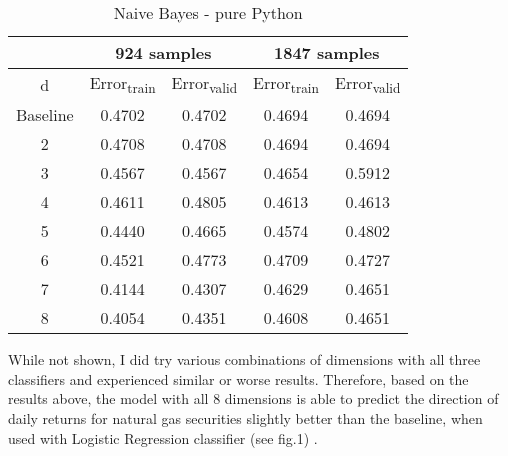 \documentclass[conference,letterpaper]{IEEEtran}
\begin{document}
\begin{table}[h]
\renewcommand{\arraystretch}{1.2}
\renewcommand{\thefootnote}{\alph{footnote}}
\caption{Naive Bayes - pure Python} \label{table3}
\begin{minipage} {0.5\textwidth}
\begin{center}
    \begin{tabular}{ | c | c | c | c | c |}
    \hline
\multirow{2}{0.1in}{} 
& \multicolumn{2}{|c|}{924 samples} & \multicolumn{2}{|c|}{1847 samples} \\
\cline{2-4}
    \hline
    d & Error\textsubscript{train} & Error\textsubscript{valid} & Error\textsubscript{train} & Error\textsubscript{valid} \\ \hline
    Baseline & 0.4702 & 0.4702 & 0.4694 & 0.4694 \\ \hline
    2 & 0.4708 & 0.4708 & 0.4694 & 0.4694 \\ \hline
    3 & 0.4567 & 0.4567 & 0.4654 & 0.5912 \\ \hline
    4 & 0.4611 & 0.4805 & 0.4613 & 0.4613 \\ \hline
    5 & 0.4440 & 0.4665 & 0.4574 & 0.4802 \\ \hline
    6 & 0.4521 & 0.4773 & 0.4709 & 0.4727 \\ \hline
    7 & 0.4144 & 0.4307 & 0.4629 & 0.4651 \\ \hline
    8 & 0.4054 & 0.4351 & 0.4608 & 0.4651 \\ \hline
    \end{tabular}
\end{center}
\end{minipage}
\end{table}

While not shown, I did try various combinations of dimensions with all three classifiers and experienced similar or worse results. Therefore,
based on the results above, the model with all 8 dimensions is able to predict the direction of daily returns for natural gas securities slightly
better than the baseline, when used with Logistic Regression classifier (see fig.1) . \\
\end{document}
